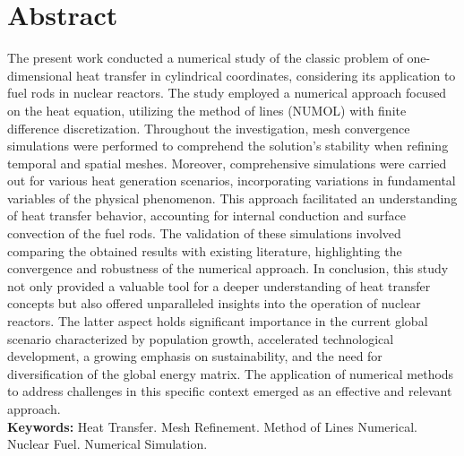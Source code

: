 \chapter*{Abstract}

The present work conducted a numerical study of the classic problem of one-dimensional heat transfer in cylindrical coordinates, considering its application to fuel rods in nuclear reactors. The study employed a numerical approach focused on the heat equation, utilizing the method of lines (NUMOL) with finite difference discretization. Throughout the investigation, mesh convergence simulations were performed to comprehend the solution's stability when refining temporal and spatial meshes. Moreover, comprehensive simulations were carried out for various heat generation scenarios, incorporating variations in fundamental variables of the physical phenomenon. This approach facilitated an understanding of heat transfer behavior, accounting for internal conduction and surface convection of the fuel rods. The validation of these simulations involved comparing the obtained results with existing literature, highlighting the convergence and robustness of the numerical approach. In conclusion, this study not only provided a valuable tool for a deeper understanding of heat transfer concepts but also offered unparalleled insights into the operation of nuclear reactors. The latter aspect holds significant importance in the current global scenario characterized by population growth, accelerated technological development, a growing emphasis on sustainability, and the need for diversification of the global energy matrix. The application of numerical methods to address challenges in this specific context emerged as an effective and relevant approach. \\

\textbf{Keywords:} Heat Transfer. Mesh Refinement. Method of Lines Numerical. Nuclear Fuel. Numerical Simulation. 